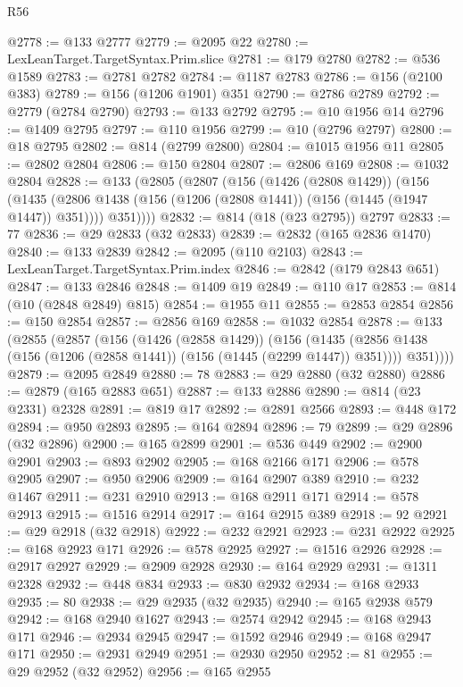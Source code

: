 \begin{lexlean}{R56}
\begin{coremodule}
{{{{{{{{{{{{{{{{{{{{{{{{{{{{{{{{{{{{{{{{{{{{{{{{{{{{{{{{{{{{{{{{{{{{{{{{{{{{{{{{{{{{{{{{{{{{{{{{{{{{{{{{{{{{{{{{{{{{{{{{{{{{{{{{{{{{{{{{{{{{{{{{{{{{{{{{{{{{{{{{{{{{{{{{{{{{{{{{{{{{{{{{{{{{{{{{{{{{{{{{{{{{{{{{{{{@2778 := @133 @2777
@2779 := @2095 @22
@2780 := LexLeanTarget.TargetSyntax.Prim.slice
@2781 := @179 @2780
@2782 := @536 @1589
@2783 := @2781 @2782
@2784 := @1187 @2783
@2786 := @156 (@2100 @383)
@2789 := @156 (@1206 @1901) @351
@2790 := @2786 @2789
@2792 := @2779 (@2784 @2790)
@2793 := @133 @2792
@2795 := @10 @1956 @14
@2796 := @1409 @2795
@2797 := @110 @1956
@2799 := @10 (@2796 @2797)
@2800 := @18 @2795
@2802 := @814 (@2799 @2800)
@2804 := @1015 @1956 @11
@2805 := @2802 @2804
@2806 := @150 @2804
@2807 := @2806 @169
@2808 := @1032 @2804
@2828 := @133
    (@2805
      (@2807
        (@156
          (@1426 (@2808 @1429))
          (@156
            (@1435 (@2806 @1438 (@156 (@1206 (@2808 @1441)) (@156 (@1445 (@1947 @1447)) @351))))
            @351))))
@2832 := @814 (@18 (@23 @2795)) @2797
@2833 := 77
@2836 := @29 @2833 (@32 @2833)
@2839 := @2832 (@165 @2836 @1470)
@2840 := @133 @2839
@2842 := @2095 (@110 @2103)
@2843 := LexLeanTarget.TargetSyntax.Prim.index
@2846 := @2842 (@179 @2843 @651)
@2847 := @133 @2846
@2848 := @1409 @19
@2849 := @110 @17
@2853 := @814 (@10 (@2848 @2849) @815)
@2854 := @1955 @11
@2855 := @2853 @2854
@2856 := @150 @2854
@2857 := @2856 @169
@2858 := @1032 @2854
@2878 := @133
    (@2855
      (@2857
        (@156
          (@1426 (@2858 @1429))
          (@156
            (@1435 (@2856 @1438 (@156 (@1206 (@2858 @1441)) (@156 (@1445 (@2299 @1447)) @351))))
            @351))))
@2879 := @2095 @2849
@2880 := 78
@2883 := @29 @2880 (@32 @2880)
@2886 := @2879 (@165 @2883 @651)
@2887 := @133 @2886
@2890 := @814 (@23 @2331) @2328
@2891 := @819 @17
@2892 := @2891 @2566
@2893 := @448 @172
@2894 := @950 @2893
@2895 := @164 @2894
@2896 := 79
@2899 := @29 @2896 (@32 @2896)
@2900 := @165 @2899
@2901 := @536 @449
@2902 := @2900 @2901
@2903 := @893 @2902
@2905 := @168 @2166 @171
@2906 := @578 @2905
@2907 := @950 @2906
@2909 := @164 @2907 @389
@2910 := @232 @1467
@2911 := @231 @2910
@2913 := @168 @2911 @171
@2914 := @578 @2913
@2915 := @1516 @2914
@2917 := @164 @2915 @389
@2918 := 92
@2921 := @29 @2918 (@32 @2918)
@2922 := @232 @2921
@2923 := @231 @2922
@2925 := @168 @2923 @171
@2926 := @578 @2925
@2927 := @1516 @2926
@2928 := @2917 @2927
@2929 := @2909 @2928
@2930 := @164 @2929
@2931 := @1311 @2328
@2932 := @448 @834
@2933 := @830 @2932
@2934 := @168 @2933
@2935 := 80
@2938 := @29 @2935 (@32 @2935)
@2940 := @165 @2938 @579
@2942 := @168 @2940 @1627
@2943 := @2574 @2942
@2945 := @168 @2943 @171
@2946 := @2934 @2945
@2947 := @1592 @2946
@2949 := @168 @2947 @171
@2950 := @2931 @2949
@2951 := @2930 @2950
@2952 := 81
@2955 := @29 @2952 (@32 @2952)
@2956 := @165 @2955
}}}}}}}}}}}}}}}}}}}}}}}}}}}}}}}}}}}}}}}}}}}}}}}}}}}}}}}}}}}}}}}}}}}}}}}}}}}}}}}}}}}}}}}}}}}}}}}}}}}}}}}}}}}}}}}}}}}}}}}}}}}}}}}}}}}}}}}}}}}}}}}}}}}}}}}}}}}}}}}}}}}}}}}}}}}}}}}}}}}}}}}}}}}}}}}}}}}}}}}}}}}}}}}}}}}
\end{coremodule}
\end{lexlean}
